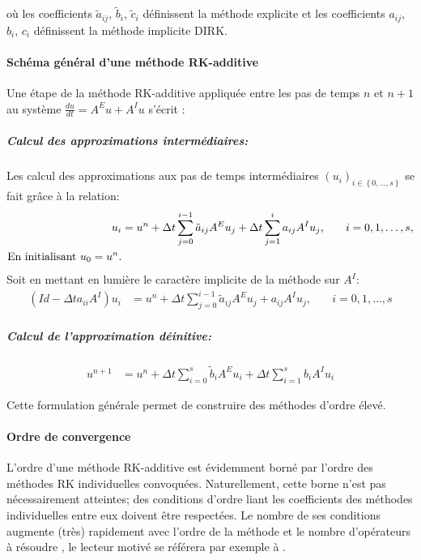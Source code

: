         où les coefficients $\tilde{a}_{ij}$, $\tilde{b}_i$, $\tilde{c}_i$ définissent la méthode explicite et 
        les coefficients $a_{ij}$, $b_i$, $c_i$ définissent la méthode implicite DIRK. 
        
    \paragraph{Schéma général d'une méthode RK-additive}
        Une étape de la méthode RK-additive appliquée entre les pas de temps $n$ et $n+1$ au système 
        $\frac{du}{dt} = A^E u + A^I u$ s'écrit :
        
        \subparagraph{Calcul des approximations intermédiaires:}
        Les calcul des approximations aux pas de temps intermédiaires $\left( u_i\right)_{i \in \left\{ 0,\ldots,s \right\}}$ 
        se fait grâce à la relation:
        \begin{align}
        u_i &= u^n + \Delta t \sum_{j=0}^{i-1} \tilde{a}_{ij} A^E u_j + \Delta t \sum_{j=1}^{i} a_{ij} A^I u_j, \quad &i = 0, 1, \ldots, s,\\\notag
        \text{En initialisant $u_0 = u^n$.}
        \end{align}
        Soit en mettant en lumière le caractère implicite de la méthode sur $A^I$:
        \begin{align}
        (Id - \Delta t a_{ii} A^I) u_i &= u^n + \Delta t \sum_{j=0}^{i-1} \tilde{a}_{ij} A^E u_j + a_{ij} A^I u_j, \quad &i= 0, 1, \ldots, s
        \end{align}
        
        \subparagraph{Calcul de l'approximation déinitive:}
        \begin{align}
        u^{n+1} &= u^n + \Delta t \sum_{i=0}^{s} \tilde{b}_i A^E u_i + \Delta t \sum_{i=1}^{s} b_i A^I u_i
        \end{align}
        
        Cette formulation générale permet de construire des méthodes d'ordre élevé. 
    \paragraph{Ordre de convergence}
        L'ordre d'une méthode RK-additive est évidemment borné par l'ordre des méthodes RK individuelles convoquées.
        Naturellement, cette borne n'est pas nécessairement atteintes; des conditions d'ordre liant
        les coefficients des méthodes individuelles entre eux doivent être respectées. Le nombre de ses conditions augmente (très) rapidement avec 
        l'ordre de la méthode et le nombre d'opérateurs à résoudre \cite{KENNEDY2003139}, le lecteur motivé se référera par exemple à \cite{Hairer1981}.